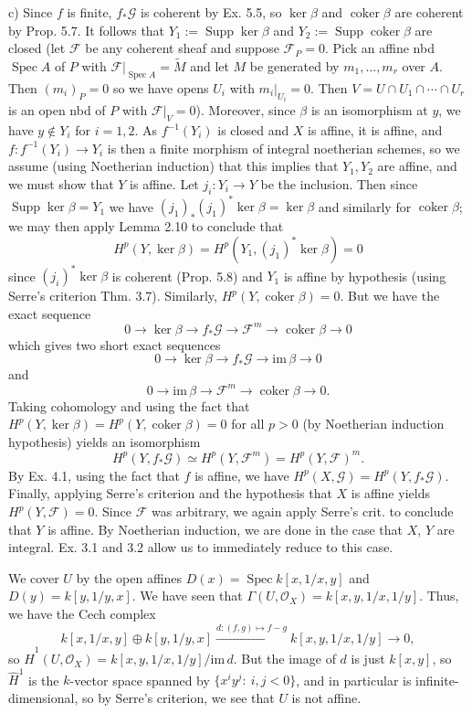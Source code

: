 \documentclass{report}
\renewcommand{\Im}{\mathrm{im\,}}
\newcommand{\F}{\mathcal{F}}
\renewcommand{\O}{\mathcal{O}}
\newcommand{\G}{\mathcal{G}}
\DeclareMathOperator{\coker}{coker}
\DeclareMathOperator{\Supp}{Supp}
\DeclareMathOperator{\Spec}{Spec}
\begin{document}
\noindent
c) Since $f$ is finite, $f_*\G$ is coherent by Ex. 5.5, so $\ker\beta$ and $\coker \beta$ are coherent by Prop. 5.7.
It follows that $Y_1:=\Supp \ker\beta$ and $Y_2:=\Supp\coker\beta$ are closed
(let $\F$ be any coherent sheaf and suppose $\F_P=0$.  Pick an affine nbd $\Spec A$ of $P$
with $\F\big|_{\Spec A}=\widetilde{M}$ and let $M$ be generated by $m_1,\ldots,m_r$ over $A$.
Then $(m_i)_P=0$ so we have opens $U_i$ with $m_i\big|_{U_i}=0$.  Then $V=U\cap U_1\cap\cdots\cap U_r$
is an open nbd of $P$ with $\F\big|_{V}=0$).
Moreover, since $\beta$ is an isomorphism at $y$, we have $y\not\in Y_i$ for $i=1,2$.
As $f^{-1}(Y_i)$ is closed and $X$ is affine, it is affine, and $f:f^{-1}(Y_i)\rightarrow Y_i$
is then a finite morphism of integral noetherian schemes, so we assume (using Noetherian
induction) that this implies that $Y_1,Y_2$ are affine, and we must show that $Y$ is affine.
Let $j_i:Y_i\rightarrow Y$ be the inclusion.  Then since $\Supp \ker\beta=Y_1$
we have $(j_1)_*(j_1)^* \ker\beta=\ker\beta$ and similarly for $\coker\beta$; we may then apply
Lemma 2.10 to conclude that
$$H^p(Y,\ker\beta)=H^p(Y_1, (j_1)^*\ker\beta)=0$$
since $(j_i)^*\ker\beta$ is coherent (Prop. 5.8) and $Y_1$ is affine by hypothesis (using Serre's criterion Thm. 3.7).
Similarly, $H^p(Y,\coker\beta)=0$.
But we have the exact sequence
$$0\rightarrow\ker\beta\rightarrow f_*\G\rightarrow \F^m\rightarrow\coker\beta\rightarrow 0$$
which gives two short exact sequences
$$0\rightarrow\ker\beta\rightarrow f_*\G\rightarrow \Im \beta\rightarrow 0$$
and
$$0\rightarrow \Im\beta\rightarrow \F^m\rightarrow\coker\beta\rightarrow 0.$$
Taking cohomology and using the fact that $H^p(Y,\ker\beta)=H^p(Y,\coker\beta)=0$ for all $p>0$
(by Noetherian induction hypothesis)
yields an isomorphism
$$H^p(Y,f_*\G)\simeq H^p(Y,\F^m)=H^p(Y,\F)^m.$$
By Ex. 4.1, using the fact that $f$ is affine, we have $H^p(X,\G)=H^p(Y,f_*\G)$.
Finally, applying Serre's criterion and the hypothesis that $X$ is affine yields
$H^p(Y,\F)=0$.  Since $\F$ was arbitrary, we again apply Serre's crit. to conclude that
$Y$ is affine.  By Noetherian induction, we are done in the case that $X$, $Y$ are integral.
Ex. 3.1 and 3.2 allow us to immediately reduce to this case.


\bigskip
{}	We cover $U$ by the open affines $D(x)=\Spec k[x,1/x,y]$ and $D(y)=k[y,1/y,x]$.  We have seen
that $\Gamma(U,\O_X)=k[x,y,1/x,1/y]$.  Thus, we have the Cech complex
$$k[x,1/x,y]\oplus k[y,1/y,x]\xrightarrow{d:(f,g)\mapsto f-g} k[x,y,1/x,1/y]\rightarrow 0,$$
so $\widehat{H}^1(U,\O_X)=k[x,y,1/x,1/y]/\Im d$.  But the image of $d$ is just $k[x,y]$, so 
$\widehat{H}^1$ is the $k$-vector space spanned by $\{x^iy^j:\ i,j <0\}$, and in particular
is infinite-dimensional, so by Serre's criterion, we see that $U$ is not affine.
\end{document}
